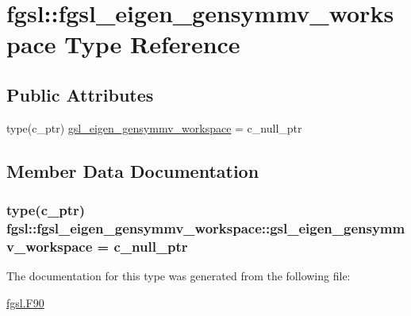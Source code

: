 \hypertarget{structfgsl_1_1fgsl__eigen__gensymmv__workspace}{}\section{fgsl\+:\+:fgsl\+\_\+eigen\+\_\+gensymmv\+\_\+workspace Type Reference}
\label{structfgsl_1_1fgsl__eigen__gensymmv__workspace}
\subsection*{Public Attributes}
\begin{DoxyCompactItemize}
\item 
type(c\+\_\+ptr) \hyperlink{structfgsl_1_1fgsl__eigen__gensymmv__workspace_aafe47b9fd2e9dd43196912878c9c687b}{gsl\+\_\+eigen\+\_\+gensymmv\+\_\+workspace} = c\+\_\+null\+\_\+ptr
\end{DoxyCompactItemize}


\subsection{Member Data Documentation}
\hypertarget{structfgsl_1_1fgsl__eigen__gensymmv__workspace_aafe47b9fd2e9dd43196912878c9c687b}{}
\subsubsection[{gsl\+\_\+eigen\+\_\+gensymmv\+\_\+workspace}]{\setlength{\rightskip}{0pt plus 5cm}type(c\+\_\+ptr) fgsl\+::fgsl\+\_\+eigen\+\_\+gensymmv\+\_\+workspace\+::gsl\+\_\+eigen\+\_\+gensymmv\+\_\+workspace = c\+\_\+null\+\_\+ptr}\label{structfgsl_1_1fgsl__eigen__gensymmv__workspace_aafe47b9fd2e9dd43196912878c9c687b}


The documentation for this type was generated from the following file\+:\begin{DoxyCompactItemize}
\item 
\hyperlink{fgsl_8F90}{fgsl.\+F90}\end{DoxyCompactItemize}
